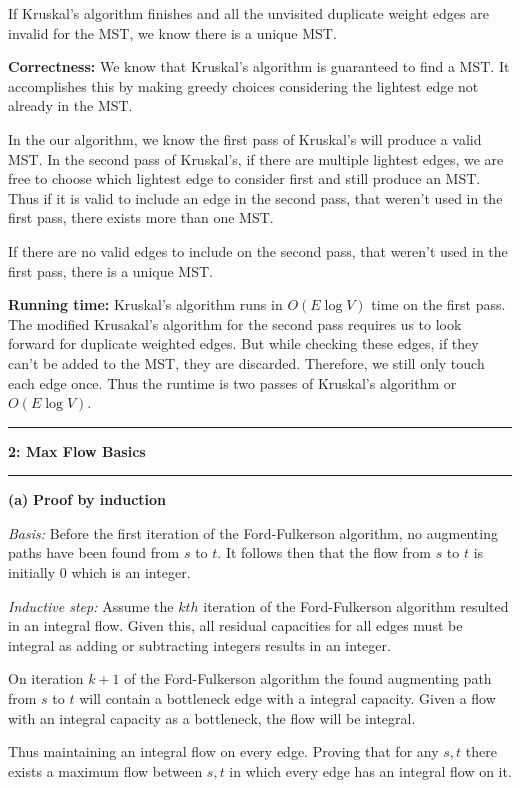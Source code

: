 \documentclass[11pt]{article}
\newcommand\question[2]{\vspace{.25in}\hrule\textbf{#1: #2}\vspace{.5em}\hrule\vspace{.10in}}
\renewcommand\part[1]{\vspace{.10in}\textbf{(#1)}}
\newcommand\correctness{\vspace{.10in}\textbf{Correctness: }}
\newcommand\runtime{\vspace{.10in}\textbf{Running time: }}
\begin{document}
 	If Kruskal's algorithm finishes and all the unvisited duplicate weight edges are invalid for the MST, we know there is a unique MST.

\correctness We know that Kruskal's algorithm is guaranteed to find a MST. It accomplishes this by making greedy choices considering the lightest edge not already in the MST.

	In the our algorithm, we know the first pass of Kruskal's will produce a valid MST. In the second pass of Kruskal's, if there are multiple lightest edges, we are free to choose which lightest edge to consider first and still produce an MST. Thus if it is valid to include an edge in the second pass, that weren't used in the first pass, there exists more than one MST.
	
	If there are no valid edges to include on the second pass, that weren't used in the first pass, there is a unique MST.

\runtime Kruskal's algorithm runs in $O(E \log V)$ time on the first pass. The modified Krusakal's algorithm for the second pass requires us to look forward for duplicate weighted edges. But while checking these edges, if they can't be added to the MST, they are discarded. Therefore, we still only touch each edge once. Thus the runtime is two passes of Kruskal's algorithm or $O(E \log V)$.


\question{2}{Max Flow Basics}

\part{a} \textbf{Proof by induction}

\textit{Basis:} Before the first iteration of the Ford-Fulkerson algorithm, no augmenting paths have been found from $s$ to $t$. It follows then that the flow from $s$ to $t$ is initially 0 which is an integer.

\textit{Inductive step:} Assume the $kth$ iteration of the Ford-Fulkerson algorithm resulted in an integral flow. Given this, all residual capacities for all edges must be integral as adding or subtracting integers results in an integer.

	On iteration $k + 1$ of the Ford-Fulkerson algorithm the found augmenting path from $s$ to $t$ will contain a bottleneck edge with a integral capacity. Given a flow with an integral capacity as a bottleneck, the flow will be integral.
	
	Thus maintaining an integral flow on every edge. Proving that for any $s,t$ there exists a maximum flow between $s,t$ in which every edge has an integral flow on it.
\end{document}
